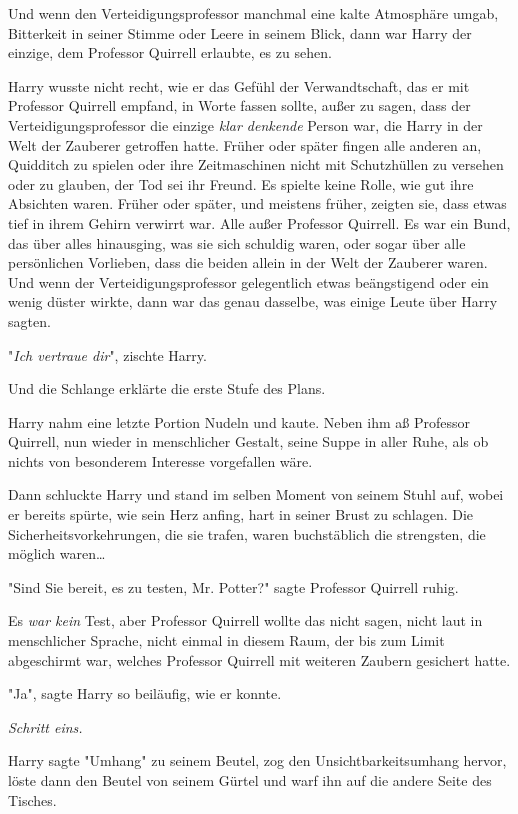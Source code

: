 {Und wenn den Verteidigungsprofessor manchmal eine kalte Atmosphäre umgab, Bitterkeit in seiner Stimme oder Leere in seinem Blick, dann war Harry der einzige, dem Professor Quirrell erlaubte, es zu sehen.

Harry wusste nicht recht, wie er das Gefühl der Verwandtschaft, das er mit Professor Quirrell empfand, in Worte fassen sollte, außer zu sagen, dass der Verteidigungsprofessor die einzige \emph{klar denkende} Person war, die Harry in der Welt der Zauberer getroffen hatte. Früher oder später fingen alle anderen an, Quidditch zu spielen oder ihre Zeitmaschinen nicht mit Schutzhüllen zu versehen oder zu glauben, der Tod sei ihr Freund. Es spielte keine Rolle, wie gut ihre Absichten waren. Früher oder später, und meistens früher, zeigten sie, dass etwas tief in ihrem Gehirn verwirrt war. Alle außer Professor Quirrell. Es war ein Bund, das über alles hinausging, was sie sich schuldig waren, oder sogar über alle persönlichen Vorlieben, dass die beiden allein in der Welt der Zauberer waren. Und wenn der Verteidigungsprofessor gelegentlich etwas beängstigend oder ein wenig düster wirkte, dann war das genau dasselbe, was einige Leute über Harry sagten.

"\emph{Ich vertraue dir}", zischte Harry.

Und die Schlange erklärte die erste Stufe des Plans.

Harry nahm eine letzte Portion Nudeln und kaute. Neben ihm aß Professor Quirrell, nun wieder in menschlicher Gestalt, seine Suppe in aller Ruhe, als ob nichts von besonderem Interesse vorgefallen wäre.

Dann schluckte Harry und stand im selben Moment von seinem Stuhl auf, wobei er bereits spürte, wie sein Herz anfing, hart in seiner Brust zu schlagen. Die Sicherheitsvorkehrungen, die sie trafen, waren buchstäblich die strengsten, die möglich waren…

"Sind Sie bereit, es zu testen, Mr. Potter?" sagte Professor Quirrell ruhig.

Es \emph{war kein} Test, aber Professor Quirrell wollte das nicht sagen, nicht laut in menschlicher Sprache, nicht einmal in diesem Raum, der bis zum Limit abgeschirmt war, welches Professor Quirrell mit weiteren Zaubern gesichert hatte.

"Ja", sagte Harry so beiläufig, wie er konnte.

\emph{\emph{Schritt eins.}}

Harry sagte "Umhang" zu seinem Beutel, zog den Unsichtbarkeitsumhang hervor, löste dann den Beutel von seinem Gürtel und warf ihn auf die andere Seite des Tisches.

}
